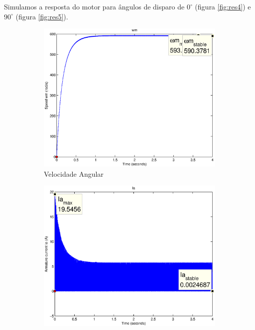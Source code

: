 \documentclass{article}
\begin{document}
Simulamos a resposta do motor para ângulos de disparo de $0^\circ$ (figura \ref{fig:res4}) e $90^\circ$ (figura \ref{fig:res5}).

\begin{figure}[H]
	\centering
	\begin{subfigure}[b]{0.49\linewidth}
		\includegraphics[width=\linewidth]{matlab/wm4}
		\caption{Velocidade Angular}
	\end{subfigure}
	\begin{subfigure}[b]{0.49\linewidth}
		\centering
		\includegraphics[width=\linewidth]{matlab/ia4}

\end{subfigure}
\end{figure}
\end{document}
